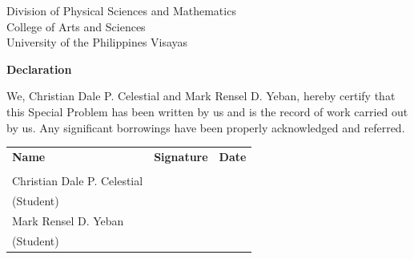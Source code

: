 \begin{center}
	Division of Physical Sciences and Mathematics\\
	College of Arts and Sciences\\
	University of the Philippines Visayas 
	
		\textbf{Declaration}
		\end{center}

We,  Christian Dale P. Celestial and Mark Rensel D. Yeban, hereby certify that this Special Problem has been written by us  and is the record of work carried out by us. Any significant borrowings have been properly acknowledged and referred.

	\begin{tabular}{lll}
	\bfseries Name  & \bfseries Signature & \bfseries Date\\ \\
	Christian Dale P. Celestial &\signaturerule  & \signaturerule\\ 
	\multicolumn{1}{l}{(Student)} \\ 
	Mark Rensel D. Yeban &\signaturerule  & \signaturerule\\ 
	\multicolumn{1}{l}{(Student)} \\ 

\end{tabular}



